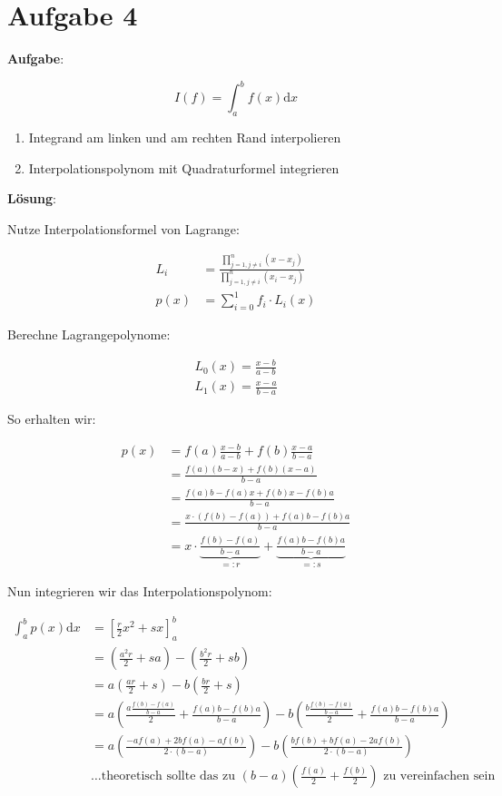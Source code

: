 \section*{Aufgabe 4}
\textbf{Aufgabe}:

\[I(f) = \int_a^b f(x) \mathrm{d}x \]

\begin{enumerate}
    \item Integrand am linken und am rechten Rand interpolieren
	\item Interpolationspolynom mit Quadraturformel integrieren
\end{enumerate}

\textbf{Lösung}:

Nutze Interpolationsformel von Lagrange:

\begin{align}
    L_i &= \frac{\prod_{j=1, j \neq i}^n (x-x_j)}{\prod_{j=1, j \neq i}^n (x_i - x_j)}\\
    p(x) &= \sum_{i=0}^{1} f_i \cdot L_i(x)
\end{align}

Berechne Lagrangepolynome:

\begin{align}
    L_0(x) = \frac{x-b}{a-b} \\
    L_1(x) = \frac{x-a}{b-a}
\end{align}

So erhalten wir:

\begin{align}
    p(x) &= f(a) \frac{x-b}{a-b} + f(b) \frac{x-a}{b-a}\\
    &= \frac{f(a) (b-x) + f(b) (x-a)}{b-a} \\
    &= \frac{f(a)b- f(a)x + f(b) x- f(b)a}{b-a}\\
    &=\frac{x \cdot \left (f(b)-f(a) \right  ) + f(a)b- f(b)a}{b-a}\\
    &= x \cdot \underbrace{\frac{f(b)-f(a)}{b-a}}_{=:r} + \underbrace{\frac{f(a)b - f(b)a}{b-a}}_{=: s}
\end{align}

Nun integrieren wir das Interpolationspolynom:

\begin{align}
    \int_a^b p(x) \mathrm{d} x &= \left [\frac{r}{2} x^2 +  sx \right ]_a^b\\
    &= \left (\frac{a^2 r}{2} + sa \right ) - \left (\frac{b^2 r}{2} + sb \right )\\
    &= a\left (\frac{a r}{2} + s \right ) - b \left (\frac{b r}{2} + s \right )\\
    &= a\left (\frac{a \frac{f(b)-f(a)}{b-a}}{2} + \frac{f(a)b - f(b)a}{b-a} \right ) - b \left (\frac{b \frac{f(b)-f(a)}{b-a}}{2} + \frac{f(a)b - f(b)a}{b-a} \right )\\
    &= a\left (\frac{-a f(a)+2b f(a)-a f(b)}{2 \cdot(b-a)}\right ) - b \left (\frac{bf(b) + b f(a) - 2 a f(b)}{2 \cdot (b-a)} \right )\\
    & \dots \text{theoretisch sollte das zu } (b-a)(\frac{f(a)}{2} + \frac{f(b)}{2}) \text{ zu vereinfachen sein}
\end{align}

